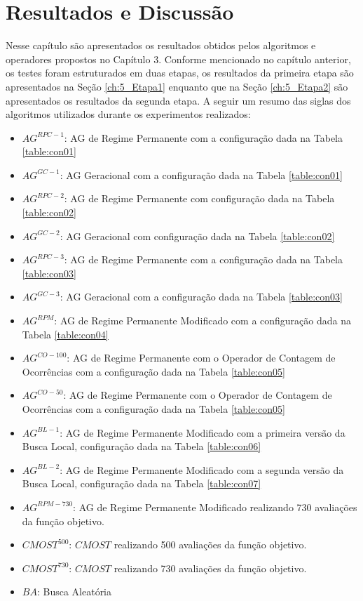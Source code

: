 \chapter{Resultados e Discussão}
\label{ch:5_ResultadosDiscucao}
Nesse capítulo são apresentados os resultados obtidos pelos algoritmos e operadores propostos no Capítulo 3. Conforme mencionado no capítulo anterior, os testes foram estruturados em duas etapas, os resultados da primeira etapa são apresentados na Seção \ref{ch:5_Etapa1} enquanto que na Seção \ref{ch:5_Etapa2} são apresentados os resultados da segunda etapa. A seguir um resumo das siglas dos algoritmos utilizados durante os experimentos realizados:

\begin{itemize}
    \item \textbf{$AG^{RPC-1}$}: AG de Regime Permanente com a configuração dada na Tabela \ref{table:con01}
    \item \textbf{$AG^{GC-1}$}: AG Geracional com a configuração dada na Tabela \ref{table:con01}
    \item \textbf{$AG^{RPC-2}$}: AG de Regime Permanente com configuração dada na Tabela \ref{table:con02}
    \item \textbf{$AG^{GC-2}$}: AG Geracional com configuração dada na Tabela \ref{table:con02}
    \item \textbf{$AG^{RPC-3}$}: AG de Regime Permanente com a configuração dada na Tabela \ref{table:con03}
    \item \textbf{$AG^{GC-3}$}: AG Geracional com a configuração dada na Tabela \ref{table:con03}

    \item \textbf{$AG^{RPM}$}: AG de Regime Permanente Modificado com a configuração dada na Tabela \ref{table:con04}
    \item \textbf{$AG^{CO-{100}}$}: AG de Regime Permanente com o Operador de Contagem de Ocorrências com a configuração dada na Tabela \ref{table:con05}
    \item \textbf{$AG^{CO-{50}}$}: AG de Regime Permanente com o Operador de Contagem de Ocorrências com a configuração dada na Tabela \ref{table:con05}

    \item \textbf{$AG^{BL-1}$}: AG de Regime Permanente Modificado com a primeira versão da Busca Local, configuração dada na Tabela \ref{table:con06}
    \item \textbf{$AG^{BL-2}$}: AG de Regime Permanente Modificado com a segunda versão da Busca Local, configuração dada na Tabela \ref{table:con07}

    \item \textbf{$AG^{RPM-730}$}: AG de Regime Permanente Modificado realizando 730 avaliações da função objetivo.
    \item \textbf{$CMOST^{500}$}: $CMOST$ realizando 500 avaliações da função objetivo.
    \item \textbf{$CMOST^{730}$}: $CMOST$ realizando 730 avaliações da função objetivo.
    \item \textbf{$BA$}: Busca Aleatória
\end{itemize}

